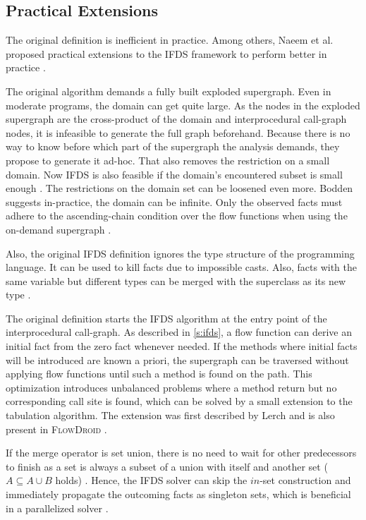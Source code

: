 \documentclass[../draft.tex]{subfiles}
\begin{document}
  
    \subsection{Practical Extensions}\label{s:ifdspractical}
    The original definition is inefficient in practice. Among others, Naeem et al. proposed practical extensions to the IFDS framework to perform better in practice \cite{Naeem2010}.

    The original algorithm demands a fully built exploded supergraph. Even in moderate programs, the domain can get quite large. As the nodes in the exploded supergraph are the cross-product of the domain and interprocedural call-graph nodes, it is infeasible to generate the full graph beforehand. Because there is no way to know before which part of the supergraph the analysis demands, they propose to generate it ad-hoc. That also removes the restriction on a small domain. Now IFDS is also feasible if the domain's encountered subset is small enough \cite{Naeem2010}.
    The restrictions on the domain set can be loosened even more. Bodden suggests in-practice, the domain can be infinite. Only the observed facts must adhere to the ascending-chain condition over the flow functions when using the on-demand supergraph \cite{Bodden2012}.
    
    Also, the original IFDS definition ignores the type structure of the programming language. It can be used to kill facts due to impossible casts. Also, facts with the same variable but different types can be merged with the superclass as its new type \cite{Naeem2010}.

    The original definition starts the IFDS algorithm at the entry point of the interprocedural call-graph. As described in \autoref{s:ifds}, a flow function can derive an initial fact from the zero fact whenever needed. If the methods where initial facts will be introduced are known a priori, the supergraph can be traversed without applying flow functions until such a method is found on the path. This optimization introduces unbalanced problems where a method return but no corresponding call site is found, which can be solved by a small extension to the tabulation algorithm. The extension was first described by Lerch \cite{Lerch2015} and is also present in \textsc{FlowDroid} \cite{Arzt2017PhD}.

    If the merge operator is set union, there is no need to wait for other predecessors to finish as a set is always a subset of a union with itself and another set ($A \subseteq A \cup B$ holds) . Hence, the IFDS solver can skip the $in$-set construction and immediately propagate the outcoming facts as singleton sets, which is beneficial in a parallelized solver \cite{Rodriguez2011}.
\end{document}
